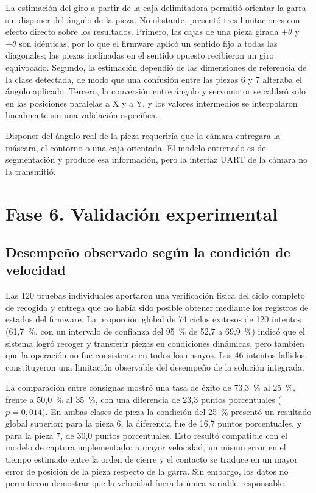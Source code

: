 La estimación del giro a partir de la caja delimitadora permitió orientar la garra sin disponer del ángulo de la pieza. No obstante, presentó tres limitaciones con efecto directo sobre los resultados. Primero, las cajas de una pieza girada $+\theta$ y $-\theta$ son idénticas, por lo que el firmware aplicó un sentido fijo a todas las diagonales; las piezas inclinadas en el sentido opuesto recibieron un giro equivocado. Segundo, la estimación dependió de las dimensiones de referencia de la clase detectada, de modo que una confusión entre las piezas 6 y 7 alteraba el ángulo aplicado. Tercero, la conversión entre ángulo y servomotor se calibró solo en las posiciones paralelas a X y a Y, y los valores intermedios se interpolaron linealmente sin una validación específica.

Disponer del ángulo real de la pieza requeriría que la cámara entregara la máscara, el contorno o una caja orientada. El modelo entrenado es de segmentación y produce esa información, pero la interfaz UART de la cámara no la transmitió.


\section{Fase 6. Validación experimental}
\label{sec:discusion_fase6}

\subsection{Desempeño observado según la condición de velocidad}

Las 120 pruebas individuales aportaron una verificación física del ciclo completo de recogida y entrega que no había sido posible obtener mediante los registros de estados del firmware. La proporción global de 74 ciclos exitosos de 120 intentos (61,7~\%, con un intervalo de confianza del 95~\% de 52,7 a 69,9~\%) indicó que el sistema logró recoger y transferir piezas en condiciones dinámicas, pero también que la operación no fue consistente en todos los ensayos. Los 46 intentos fallidos constituyeron una limitación observable del desempeño de la solución integrada.

La comparación entre consignas mostró una tasa de éxito de 73,3~\% al 25~\%, frente a 50,0~\% al 35~\%, con una diferencia de 23,3 puntos porcentuales ($p=0{,}014$). En ambas clases de pieza la condición del 25~\% presentó un resultado global superior: para la pieza 6, la diferencia fue de 16,7 puntos porcentuales, y para la pieza 7, de 30,0 puntos porcentuales. Esto resultó compatible con el modelo de captura implementado: a mayor velocidad, un mismo error en el tiempo estimado entre la orden de cierre y el contacto se traduce en un mayor error de posición de la pieza respecto de la garra. Sin embargo, los datos no permitieron demostrar que la velocidad fuera la única variable responsable.

